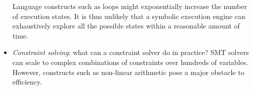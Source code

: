 \begin{itemize}[itemsep=1mm]
Language constructs such as loops might exponentially increase the number of execution states. It is thus unlikely that a symbolic execution engine can exhaustively explore all the possible states within a reasonable amount of time. %
  \item {\em Constraint solving}: what can a constraint solver do in practice?
SMT solvers can scale to complex combinations of constraints over hundreds of variables. However, constructs such as non-linear arithmetic pose a major obstacle to efficiency.

\end{itemize}
